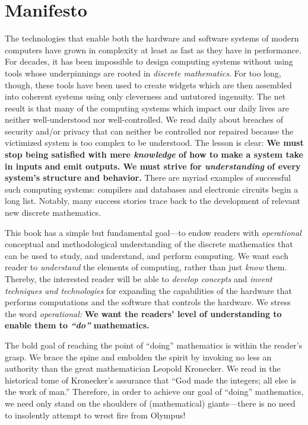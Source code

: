 
\chapter*{Manifesto}

The technologies that enable both the hardware and software systems of modern computers have grown in complexity at least as fast as they have in performance.  For decades, it has been impossible to design computing systems without using tools whose underpinnings are rooted
in {\it discrete mathematics}.  For too long, though, these tools have been used to create widgets which are then assembled into coherent systems using only cleverness and untutored ingenuity.  The net result is that many of the computing systems which impact our daily lives are neither well-understood nor well-controlled.  We read daily about breaches of security and/or privacy that can neither be controlled nor repaired because the victimized system is too complex to be understood.  The lesson is clear: {\bf We must stop being satisfied with mere {\em knowledge} of how to make a system take in inputs and emit outputs.  We must strive for {\em understanding} of every system's structure and behavior.}  There are myriad examples of successful such computing systems: compilers and databases and electronic circuits begin a long list.  Notably, many success stories trace back to the development of relevant new discrete mathematics.

This book has a simple but fundamental goal---to endow readers with {\em operational} conceptual and methodological understanding of the discrete mathematics that can be used to study, and understand, and perform computing.  We want each reader to {\em understand} the elements of computing, rather than just {\em know} them.  Thereby, the interested reader will be able to {\em develop concepts} and {\em invent techniques and technologies} for expanding the capabilities of the hardware that performs computations and the software that controls the hardware.  We stress the word {\it operational:}  {\bf We want the readers' level of understanding to enable them to {\em ``do''} mathematics.}

\bigskip


The bold goal of reaching the point of ``doing'' mathematics is within the reader's grasp.  We brace the spine and embolden the spirit by invoking no less an authority than the great mathematician Leopold Kronecker.  We read in the historical tome \cite{Bell86} of Kronecker's assurance that ``God made the integers; all else is the work of man.''  Therefore, in order to achieve our goal of ``doing'' mathematics, we need only stand on the shoulders of (mathematical) giants---there is no need to insolently attempt to wrest fire from Olympus!

